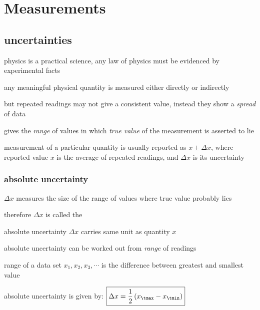 \chapter{Measurements}

\section{uncertainties}

physics is a practical science, any law of physics must be evidenced by experimental facts

any meaningful physical quantity is measured either directly or indirectly

but repeated readings may not give a consistent value, instead they show a \emph{spread} of data

 gives the \emph{range} of values in which \emph{true value} of the measurement is asserted to lie

measurement of a particular quantity is usually reported as $x \pm \Delta x$, where reported value $x$ is the average of repeated readings, and $\Delta x$ is its uncertainty

\subsection{absolute uncertainty}

$\Delta x$ measures the size of the range of values where true value probably lies

therefore $\Delta x$ is called the 

\cmt absolute uncertainty $\Delta x$ carries same unit as quantity $x$

\cmt absolute uncertainty can be worked out from \emph{range} of readings

range of a data set ${x_1, x_2, x_3, \cdots}$ is the difference between greatest and smallest value

absolute uncertainty is given by: $\boxed{\Delta x = \frac{1}{2}\left(x_\tmax-x_\tmin\right)}$

